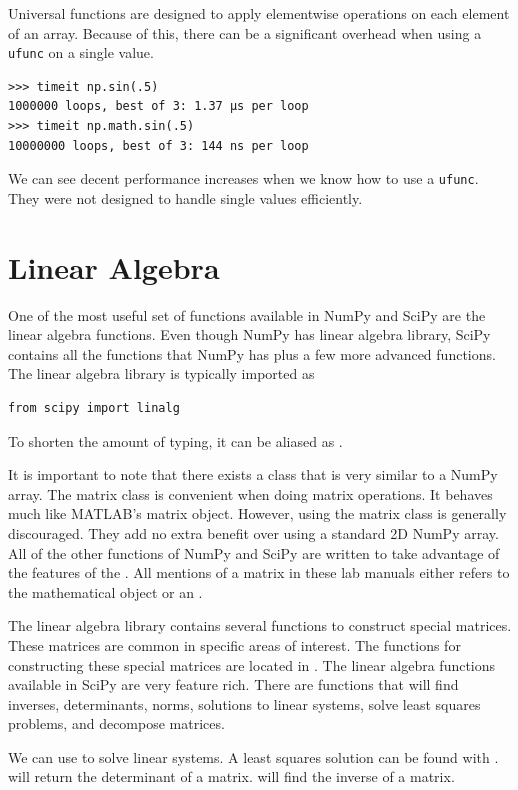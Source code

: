 Universal functions are designed to apply elementwise operations on each element of an array.
Because of this, there can be a significant overhead when using a \texttt{ufunc} on a single value.
\begin{lstlisting}
>>> timeit np.sin(.5)
1000000 loops, best of 3: 1.37 µs per loop
>>> timeit np.math.sin(.5)
10000000 loops, best of 3: 144 ns per loop
\end{lstlisting}
We can see decent performance increases when we know how to use a \texttt{ufunc}.
They were not designed to handle single values efficiently.

\section*{Linear Algebra}
One of the most useful set of functions available in NumPy and SciPy are the linear algebra functions.
Even though NumPy has linear algebra library, SciPy contains all the functions that NumPy has plus a few more advanced functions.
The linear algebra library is typically imported as
\begin{lstlisting}
from scipy import linalg
\end{lstlisting}
To shorten the amount of typing, it can be aliased as .

It is important to note that there exists a  class that is very similar to a NumPy array.
The matrix class is convenient when doing matrix operations.
It behaves much like MATLAB's matrix object.
However, using the matrix class is generally discouraged.  They add no extra benefit over using a standard 2D NumPy array.
All of the other functions of NumPy and SciPy are written to take advantage of the features of the .
All mentions of a matrix in these lab manuals either refers to the mathematical object or an .

The linear algebra library contains several functions to construct special matrices.
These matrices are common in specific areas of interest.
The functions for constructing these special matrices are located in .
The linear algebra functions available in SciPy are very feature rich.
There are functions that will find inverses, determinants, norms, solutions to linear systems, solve least squares problems, and decompose matrices.

We can use  to solve linear systems.  A least squares solution can be found with .
 will return the determinant of a matrix.  will find the inverse of a matrix.


